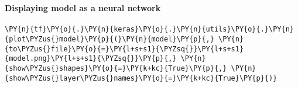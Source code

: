     \begin{center}
    \end{center}
    { \hspace*{\fill} \\}
    
    \hypertarget{displaying-model-as-a-neural-network}{%
\paragraph{Displaying model as a neural
network}\label{displaying-model-as-a-neural-network}}

    \begin{tcolorbox}[breakable, size=fbox, boxrule=1pt, pad at break*=1mm,colback=cellbackground, colframe=cellborder]
\begin{Verbatim}[commandchars=\\\{\}]
\PY{n}{tf}\PY{o}{.}\PY{n}{keras}\PY{o}{.}\PY{n}{utils}\PY{o}{.}\PY{n}{plot\PYZus{}model}\PY{p}{(}\PY{n}{model}\PY{p}{,} \PY{n}{to\PYZus{}file}\PY{o}{=}\PY{l+s+s1}{\PYZsq{}}\PY{l+s+s1}{model.png}\PY{l+s+s1}{\PYZsq{}}\PY{p}{,} \PY{n}{show\PYZus{}shapes}\PY{o}{=}\PY{k+kc}{True}\PY{p}{,} \PY{n}{show\PYZus{}layer\PYZus{}names}\PY{o}{=}\PY{k+kc}{True}\PY{p}{)}
\end{Verbatim}
\end{tcolorbox}
 
            
    
    \begin{center}
    \end{center}
    { \hspace*{\fill} \\}
